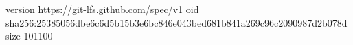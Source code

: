 version https://git-lfs.github.com/spec/v1
oid sha256:25385056dbe6c6d5b15b3e6bc846e043bed681b841a269c96c2090987d2b078d
size 101100
